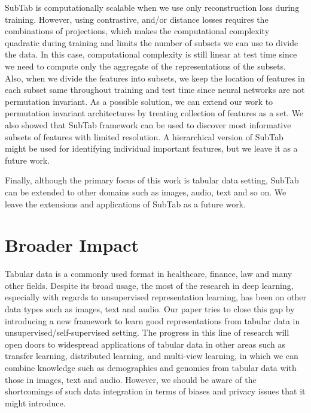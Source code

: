 SubTab is computationally scalable when we use only reconstruction loss during training. However, using contrastive, and/or distance losses requires the combinations of projections, which makes the computational complexity quadratic during training and limits the number of subsets we can use to divide the data. In this case, computational complexity is still linear at test time since we need to compute only the aggregate of the representations of the subsets. Also, when we divide the features into subsets, we keep the location of features in each subset same throughout training and test time since neural networks are not permutation invariant. As a possible solution, we can extend our work to permutation invariant architectures by treating collection of features as a set. We also showed that SubTab framework can be used to discover most informative subsets of features with limited resolution. A hierarchical version of SubTab might be used for identifying individual important features, but we leave it as a future work.

Finally, although the primary focus of this work is tabular data setting, SubTab can be extended to other domains such as images, audio, text and so on. We leave the extensions and applications of SubTab as a future work.

\section{Broader Impact}\label{broader_impact}

Tabular data is a commonly used format in healthcare, finance, law and many other fields. Despite its broad usage, the most of the research in deep learning, especially with regards to unsupervised representation learning, has been on other data types such as images, text and audio. Our paper tries to close this gap by introducing a new framework to learn good representations from tabular data in unsupervised/self-supervised setting. The progress in this line of research will open doors to widespread applications of tabular data in other areas such as transfer learning, distributed learning, and multi-view learning, in which we can combine knowledge such as demographics and genomics from tabular data with those in images, text and audio. However, we should be aware of the shortcomings of such data integration in terms of biases and privacy issues that it might introduce.


